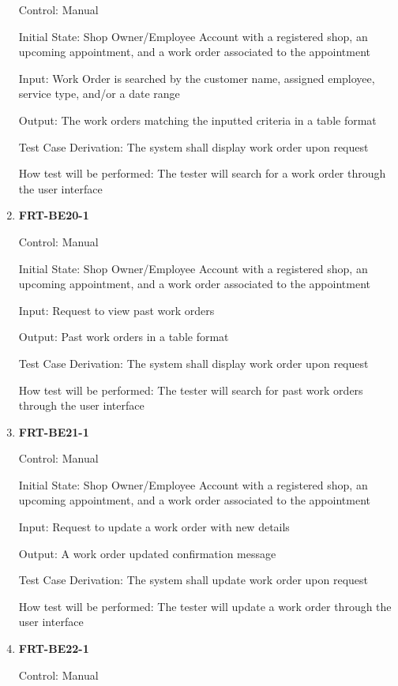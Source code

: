 \documentclass[12pt, titlepage]{article}
\begin{document}
\begin{enumerate}
	      Control: Manual

	      Initial State: Shop Owner/Employee Account with a registered shop, an upcoming appointment, and a
	      work order associated to the appointment

	      Input: Work Order is searched by the customer name, assigned employee, service type, and/or a date
	      range

	      Output: The work orders matching the inputted criteria in a table format

	      Test Case Derivation: The system shall display work order upon request

	      How test will be performed: The tester will search for a work order through the user interface

	\item \textbf{FRT-BE20-1}

	      Control: Manual

	      Initial State: Shop Owner/Employee Account with a registered shop, an upcoming appointment, and a
	      work order associated to the appointment

	      Input: Request to view past work orders

	      Output: Past work orders in a table format

	      Test Case Derivation: The system shall display work order upon request

	      How test will be performed: The tester will search for past work orders through the user interface

	\item \textbf{FRT-BE21-1}

	      Control: Manual

	      Initial State: Shop Owner/Employee Account with a registered shop, an upcoming appointment, and a
	      work order associated to the appointment

	      Input: Request to update a work order with new details

	      Output: A work order updated confirmation message

	      Test Case Derivation: The system shall update work order upon request

	      How test will be performed: The tester will update a work order through the user interface

	\item \textbf{FRT-BE22-1}

	      Control: Manual


\end{enumerate}
\end{document}
